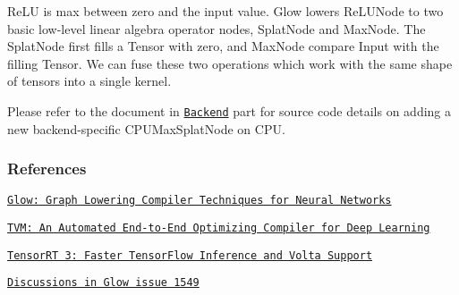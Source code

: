 Re\+LU is max between zero and the input value. Glow lowers {\ttfamily Re\+L\+U\+Node} to two basic low-\/level linear algebra operator nodes, {\ttfamily Splat\+Node} and {\ttfamily Max\+Node}. The {\ttfamily Splat\+Node} first fills a Tensor with zero, and {\ttfamily Max\+Node} compare {\ttfamily Input} with the filling Tensor. We can fuse these two operations which work with the same shape of tensors into a single kernel.

Please refer to the document in \href{https://github.com/pytorch/glow/blob/master/docs/Backends.md#backend-specific-nodes-and-instructions}{\tt Backend} part for source code details on adding a new backend-\/specific C\+P\+U\+Max\+Splat\+Node on C\+PU.

\subsubsection*{References}


\begin{DoxyItemize}
\item \href{https://arxiv.org/abs/1805.00907}{\tt Glow\+: Graph Lowering Compiler Techniques for Neural Networks}
\item \href{https://arxiv.org/abs/1802.04799}{\tt T\+V\+M\+: An Automated End-\/to-\/\+End Optimizing Compiler for Deep Learning}
\item \href{https://devblogs.nvidia.com/tensorrt-3-faster-tensorflow-inference/}{\tt Tensor\+RT 3\+: Faster Tensor\+Flow Inference and Volta Support}
\item \href{https://github.com/pytorch/glow/issues/1549#issuecomment-416283664}{\tt Discussions in Glow issue 1549} 
\end{DoxyItemize}